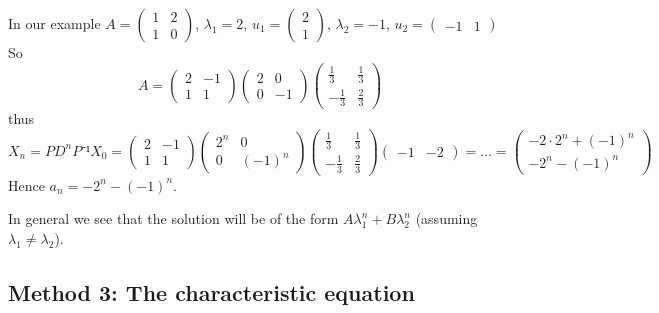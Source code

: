 \documentclass[english]{lbscript}
\begin{document}
\begin{example}{}{}
	In our example \(A=\begin{pmatrix} 1  & 2 \\ 1  & 0 \end{pmatrix}\), \(𝜆_{1}=2\), \(u_1= \begin{pmatrix}
		2 \\ 1\end{pmatrix}\),
	\(𝜆_{2}=-1\), \(u_2=\begin{pmatrix} -1&1\end{pmatrix}\)\\
	So
	\begin{equation}
		\label{eq:66}
		A = \begin{pmatrix} 2  & -1 \\ 1  & 1 \end{pmatrix}
		\begin{pmatrix} 2  & 0 \\ 0  & -1 \end{pmatrix}
		\begin{pmatrix} \frac{1}{3}  & \frac{1}{3} \\ -\frac{1}{3}  & \frac{2}{3} \end{pmatrix}
	\end{equation}
	thus
	\begin{equation}
		\label{eq:67}
		X_{n}= PD^{n}P⁻¹ X_0 = \begin{pmatrix} 2  & -1 \\ 1  & 1 \end{pmatrix}
		\begin{pmatrix} 2^{n}  & 0 \\ 0  & (-1)^{n} \end{pmatrix}
		\begin{pmatrix} \frac{1}{3}  & \frac{1}{3} \\ -\frac{1}{3}  & \frac{2}{3} \end{pmatrix} \begin{pmatrix} -1 & -2 \end{pmatrix} = \dots =
		\begin{pmatrix} -2⋅2^{n} + (-1)^{n} \\ -2^{n} - (-1)^{n} \end{pmatrix}
	\end{equation}
	Hence \(a_n=-2^{n}-(-1)^{n}\).

	In general we see that the solution will be of the form \(A 𝜆_{1}^{n}+B 𝜆_{2}^{n}\) (assuming \(𝜆_{1}≠𝜆_{2}\)).
\end{example}

\subsection{Method 3: The characteristic equation}
\label{sec:meth-3:-char}
\end{document}
